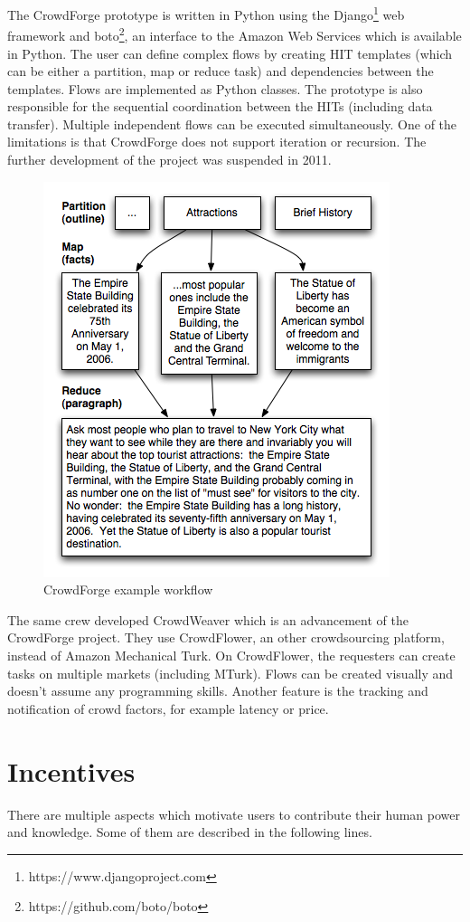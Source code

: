 The CrowdForge prototype is written in Python using the Django\footnote{https://www.djangoproject.com} web framework and boto\footnote{https://github.com/boto/boto}, an interface to the Amazon Web Services which is available in Python. The user can define complex flows by creating HIT templates (which can be either a partition, map or reduce task) and dependencies between the templates. Flows are implemented as Python classes. The prototype is also responsible for the sequential coordination between the HITs (including data transfer). Multiple independent flows can be executed simultaneously. One of the limitations is that CrowdForge does not support iteration or recursion. The further development of the project was suspended in 2011.
\begin{figure}
\centering
\includegraphics[scale=0.6]{images/crowdforge-article.png}
\caption{CrowdForge example workflow}
\label{crowdforgeflow}
\end{figure}

The same crew developed CrowdWeaver\cite{crowdweaver} which is an advancement of the CrowdForge project. They use CrowdFlower, an other crowdsourcing platform, instead of Amazon Mechanical Turk. On CrowdFlower, the requesters can create tasks on multiple markets (including MTurk). Flows can be created visually and doesn't assume any programming skills. Another feature is the tracking and notification of crowd factors, for example latency or price.

\section{Incentives}
There are multiple aspects which motivate users to contribute their human power and knowledge. Some of them are described in the following lines.
